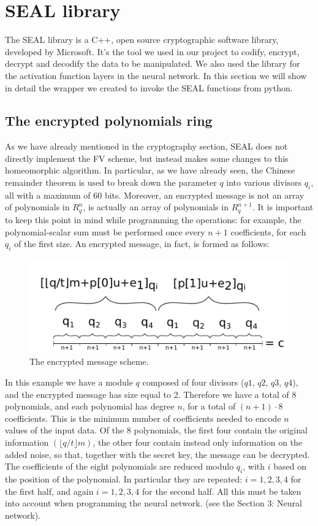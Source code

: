 \section{SEAL library}

The SEAL library is a C++, open source cryptographic software library, developed by Microsoft. It's the tool we used in our project to codify, encrypt, decrypt and decodify the data to be manipulated. We also used the library for the activation function layers in the neural network. In this section we will show in detail the wrapper we created to invoke the SEAL functions from python.

\subsection{The encrypted polynomials ring}

As we have already mentioned in the cryptography section, SEAL does not directly implement the FV scheme, but instead makes some changes to this homeomorphic algorithm. In particular, as we have already seen, the Chinese remainder theorem is used to break down the parameter $q$ into various divisors $q_i$, all with a maximum of 60 bits. Moreover, an encrypted message is not an array of polynomials in $R^n_q$, is actually an array of polynomials in $R^{n+1}_q$. It is important to keep this point in mind while programming the operations: for example, the polynomial-scalar sum must be performed once every $n+1$ coefficients, for each $q_i$ of the first size. An encrypted message, in fact, is formed as follows:

\begin{figure}[H]
	\centering
	\includegraphics[width=\textwidth]{images/fig3.pdf}
    \caption{The encrypted message scheme.}
    \label{fig:im3}
\end{figure}

In this example we have a module $q$ composed of four divisors ($q1$, $q2$, $q3$, $q4$), and the encrypted message has size equal to 2. Therefore we have a total of 8 polynomials, and each polynomial has degree $n$, for a total of $(n+1)\cdot8$ coefficients. This is the minimum number of coefficients needed to encode $n$ values of the input data. Of the 8 polynomials, the first four contain the original information $(\lfloor q/t \rfloor m)$, the other four contain instead only information on the added noise, so that, together with the secret key, the message can be decrypted. The coefficients of the eight polynomials are reduced modulo $q_i$, with $i$ based on the position of the polynomial. In particular they are repeated: $i = 1,2,3,4$ for the first half, and again $i = 1,2,3,4$ for the second half. All this must be taken into account when programming the neural network. (see the Section 3: Neural network).

